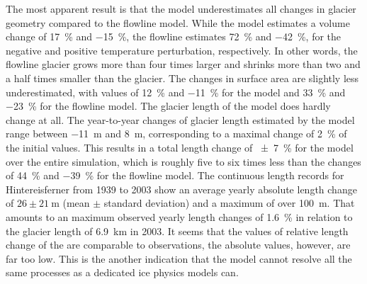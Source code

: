     The most apparent result is that the \vas{} model underestimates all changes in glacier geometry compared to the flowline model. While the \vas{} model estimates a volume change of \SI{+17}{\percent} and \SI{-15}{\percent}, the flowline estimates \SI{+72}{\percent} and \SI{-42}{\percent}, for the negative and positive temperature perturbation, respectively. In other words, the flowline glacier grows more than four times larger and shrinks more than two and a half times smaller than the \vas{} glacier.
    The changes in surface area are slightly less underestimated, with values of \SI{+12}{\percent} and \SI{-11}{\percent} for the \vas{} model and \SI{+33}{\percent} and \SI{-23}{\percent} for the flowline model. The glacier length of the \vas{} model does hardly change at all. The year-to-year changes of glacier length estimated by the \vas{} model range between \SI{-11}{\meter} and \SI{+8}{\meter}, corresponding to a maximal change of \SI{2}{\percent} of the initial values. This results in a total length change of \SI{\pm7}{\percent} for the \vas{} model over the entire simulation, which is roughly five to six times less than the changes of \SI{+44}{\percent} and \SI{-39}{\percent} for the flowline model. The continuous length records for Hintereisferner from 1939 to 2003 \citep{Leclercq2014} show an average yearly absolute length change of $26\pm{}\SI{21}{\meter}$ (mean $\pm$ standard deviation) and a maximum of over \SI{100}{\meter}. That amounts to an maximum observed yearly length changes of \SI{1.6}{\percent} in relation to the glacier length of \SI{6.9}{\kilo\meter} in 2003. It seems that the values of relative length change of the \vas{} are comparable to observations, the absolute values, however, are far too low. This is the another indication that the \vas{} model cannot resolve all the same processes as a dedicated ice physics models can.
    
